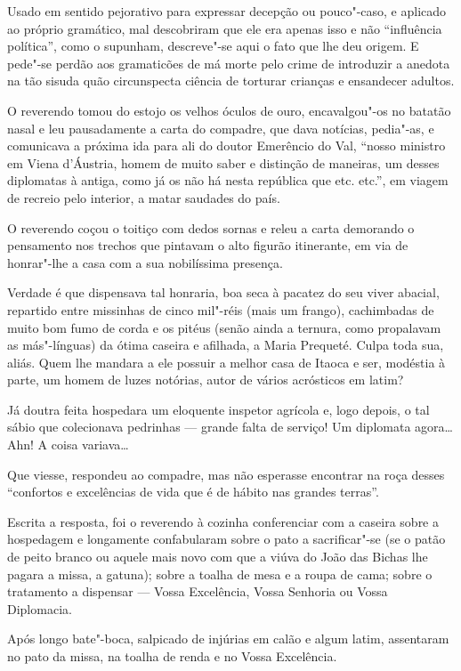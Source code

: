 Usado em sentido pejorativo para expressar decepção ou pouco"-caso, e
aplicado ao próprio gramático, mal descobriram que ele era apenas isso e
não ``influência política'', como o supunham, descreve"-se aqui o fato
que lhe deu origem. E pede"-se perdão aos gramaticões de má morte pelo
crime de introduzir a anedota na tão sisuda quão circunspecta ciência de
torturar crianças e ensandecer adultos.

O reverendo tomou do estojo os velhos óculos de ouro, encavalgou"-os no
batatão nasal e leu pausadamente a carta do compadre, que dava notícias,
pedia"-as, e comunicava a próxima ida para ali do doutor Emerêncio do
Val, ``nosso ministro em Viena d'Áustria, homem de muito saber e
distinção de maneiras, um desses diplomatas à antiga, como já os não há
nesta república que etc. etc.'', em viagem de recreio pelo interior, a
matar saudades do país.

O reverendo coçou o toitiço com dedos sornas e releu a carta demorando o
pensamento nos trechos que pintavam o alto figurão itinerante, em via de
honrar"-lhe a casa com a sua nobilíssima presença.

Verdade é que dispensava tal honraria, boa seca à pacatez do seu viver
abacial, repartido entre missinhas de cinco mil"-réis (mais um frango),
cachimbadas de muito bom fumo de corda e os pitéus (senão ainda a
ternura, como propalavam as más"-línguas) da ótima caseira e afilhada, a
Maria Prequeté. Culpa toda sua, aliás. Quem lhe mandara a ele possuir a
melhor casa de Itaoca e ser, modéstia à parte, um homem de luzes
notórias, autor de vários acrósticos em latim?

Já doutra feita hospedara um eloquente inspetor agrícola e, logo depois,
o tal sábio que colecionava pedrinhas --- grande falta de serviço! Um
diplomata agora\ldots{} Ahn! A coisa variava\ldots{}

Que viesse, respondeu ao compadre, mas não esperasse encontrar na roça
desses ``confortos e excelências de vida que é de hábito nas grandes
terras''.

Escrita a resposta, foi o reverendo à cozinha conferenciar com a caseira
sobre a hospedagem e longamente confabularam sobre o pato a
sacrificar"-se (se o patão de peito branco ou aquele mais novo com que a
viúva do João das Bichas lhe pagara a missa, a gatuna); sobre a toalha
de mesa e a roupa de cama; sobre o tratamento a dispensar --- Vossa
Excelência, Vossa Senhoria ou Vossa Diplomacia.

Após longo bate"-boca, salpicado de injúrias em calão e algum latim,
assentaram no pato da missa, na toalha de renda e no Vossa Excelência.

